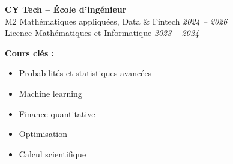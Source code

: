 \textbf{CY Tech -- École d'ingénieur} \\
M2 Mathématiques appliquées, Data \& Fintech \hfill \textit{2024 -- 2026}\\
Licence Mathématiques et Informatique \hfill \textit{2023 -- 2024}

\vspace{0.08cm}
\textbf{Cours clés :}
\begin{itemize}
    \item Probabilités et statistiques avancées
    \item Machine learning
    \item Finance quantitative
    \item Optimisation
    \item Calcul scientifique
\end{itemize}
